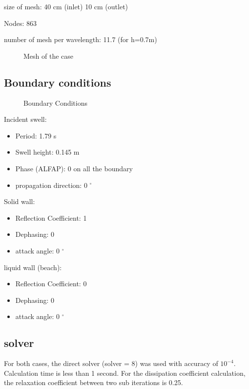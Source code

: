 size of mesh: 40 cm (inlet) 10 cm (outlet)

Nodes: 863

number of mesh per wavelength: 11.7 (for h=0.7m)

\begin{figure}[h]
\begin{center}
\end{center}
\caption{Mesh of the case}
\label{fig:breaking_Mesh}
\end{figure}

\subsection{Boundary conditions}
\begin{figure}[h]
\begin{center}
\end{center}
\caption{Boundary Conditions}
\label{fig:breaking_bc}
\end{figure}

Incident swell:
\begin{itemize}
\item Period: 1.79 s
\item Swell height: 0.145 m
\item Phase (ALFAP): 0 on all the boundary
\item propagation direction: 0 $^\circ$
\end{itemize}

Solid wall:
\begin{itemize}
\item Reflection Coefficient: 1
\item Dephasing: 0
\item attack angle: 0 $^\circ$
\end{itemize}
liquid wall (beach): 
\begin{itemize}
\item Reflection Coefficient: 0
 \item Dephasing: 0
\item attack angle: 0 $^\circ$
\end{itemize}

\subsection{solver}
For both cases, the direct solver (solver = 8) was used with
accuracy of $10^{-4}$. Calculation time is less than 1 second.
For the dissipation coefficient calculation, the relaxation coefficient between two sub
iterations is 0.25.



